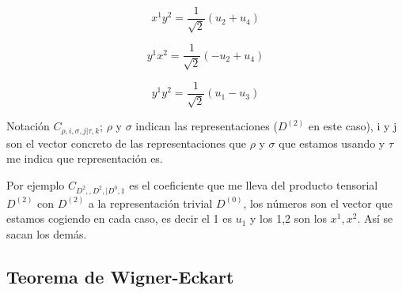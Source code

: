 \documentclass{article}
\begin{document}
$$x^1y^2=\frac{1}{\sqrt{2}}(u_2+u_4)$$

$$y^1x^2=\frac{1}{\sqrt{2}}(-u_2+u_4)$$

$$y^1y^2=\frac{1}{\sqrt{2}}(u_1-u_3)$$

Notación $C_{\rho, i, \sigma ,j | \tau , k}$; $\rho$ y $\sigma$ indican las representaciones ($D^{(2)}$ en este caso), i y j son el vector concreto de las representaciones que $\rho$ y $\sigma$ que estamos usando y $\tau$ me indica que representación es.

Por ejemplo $C_{D^2,,D^2, |D^0 ,1}$ es el coeficiente que me lleva del producto tensorial $D^{(2)}$ con $D^{(2)}$ a la representación trivial $D^{(0)}$, los números son el vector que estamos cogiendo en cada caso, es decir el 1 es $u_1$ y los 1,2 son los $x^1,x^2$. Así se sacan los demás.



\subsection{Teorema de Wigner-Eckart}
\end{document}
